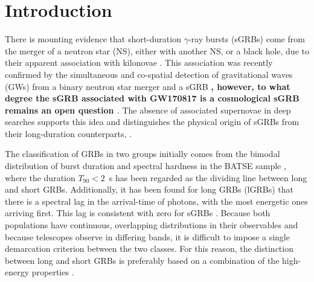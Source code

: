 \documentclass[referee]{aa}
\providecommand{\DIFaddtex}[1]{{\bf #1}} %
\providecommand{\DIFaddbegin}{} %
\providecommand{\DIFaddend}{} %
\providecommand{\DIFadd}[1]{\texorpdfstring{\DIFaddtex{#1}}{#1}} %
\newcommand{\DIFaddincludegraphics}[2][]{{\color{blue}\fbox{\DIFOincludegraphics[#1]{#2}}}} %
\DeclareRobustCommand{\DIFaddbegin}{\DIFOaddbegin \let\includegraphics\DIFaddincludegraphics} %
\DeclareRobustCommand{\DIFaddend}{\DIFOaddend \let\includegraphics\DIFOincludegraphics} %
\begin{document}

\maketitle

\section{Introduction}

There is mounting evidence that short-duration $\gamma$-ray bursts (sGRBs) come
from the merger of a neutron star (NS), either with another NS, or a black hole,
due to their apparent association with kilonovae \citep{Barnes2013a,
	Tanvir2013b, Berger2013b, Yang2015, Jin2016, Rosswog2016}. This association was
recently confirmed by the simultaneous and co-spatial detection of gravitational
waves (GWs) from a binary neutron star merger and a sGRB
\citep{LIGOScientificCollaboration2017a, Goldstein2017, Savchenko2017}\DIFaddbegin \DIFadd{, however,
to what degree the sGRB associated with GW170817 is a cosmological sGRB remains
an open question \citep{Lyman2018, Margutti2018}}\DIFaddend . The absence of associated
supernovae in deep searches \citep[e.g.][]{Hjorth2005a,Fox2005,Hjorth2005b,
	Kann2011} supports this idea and distinguishes the physical origin of sGRBs from
their long-duration counterparts, \citep[albeit see also][]{Fynbo2006b,
	Valle2006, Gal-Yam2006}.

The classification of GRBs in two groups initially comes from the bimodal
distribution of burst duration and spectral hardness in the BATSE sample \citep{Kouveliotou1993},
where the duration $T_{90} < 2$~s has been regarded as the dividing line between long
and short GRBs. Additionally, it has been found for long GRBs (lGRBs) that there is a
spectral lag in the arrival-time of photons, with the most energetic ones
arriving first. This lag is consistent with zero for sGRBs
\citep{Norris2006}. Because both populations have continuous, overlapping
distributions in their observables and because telescopes observe in differing
bands, it is difficult to impose a single demarcation criterion between the two
classes. For this reason, the distinction between long and short GRBs is
preferably based on a combination of the high-energy properties \citep{Zhang2009,
	Kann2011, Bromberg2012a, Bromberg2013}.
\end{document}
